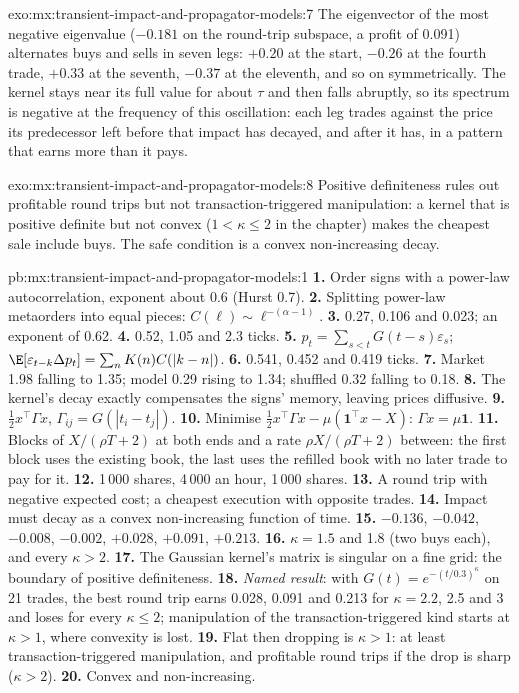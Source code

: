 \begin{solution}{exo:mx:transient-impact-and-propagator-models:7}
The eigenvector of the most negative eigenvalue ($-0.181$ on the round-trip subspace, a profit of 0.091) alternates buys and sells in seven legs: $+0.20$
at the start, $-0.26$ at the fourth trade, $+0.33$ at the seventh, $-0.37$ at the eleventh, and so on symmetrically. The kernel stays near its full value
for about $\tau$ and then falls abruptly, so its spectrum is negative at the frequency of this oscillation: each leg trades against the price its
predecessor left before that impact has decayed, and after it has, in a pattern that earns more than it pays.
\end{solution}

\begin{solution}{exo:mx:transient-impact-and-propagator-models:8}
Positive definiteness rules out profitable round trips but not transaction-triggered manipulation: a kernel that is positive definite but not convex
($1<\kappa\le2$ in the chapter) makes the cheapest sale include buys. The safe condition is a convex non-increasing decay.
\end{solution}

\begin{solution}{pb:mx:transient-impact-and-propagator-models:1}
\textbf{1.} Order signs with a power-law autocorrelation, exponent about 0.6 (Hurst 0.7).
\textbf{2.} Splitting power-law metaorders into equal pieces: $C(\ell)\sim\ell^{-(\alpha-1)}$.
\textbf{3.} 0.27, 0.106 and 0.023; an exponent of 0.62.
\textbf{4.} 0.52, 1.05 and 2.3 ticks.
\textbf{5.} $p_t=\sum_{s<t}G(t-s)\varepsilon_s$; $\E[\varepsilon_{t-k}\Delta p_t]=\sum_nK(n)C(|k-n|)$.
\textbf{6.} 0.541, 0.452 and 0.419 ticks.
\textbf{7.} Market 1.98 falling to 1.35; model 0.29 rising to 1.34; shuffled 0.32 falling to 0.18.
\textbf{8.} The kernel's decay exactly compensates the signs' memory, leaving prices diffusive.
\textbf{9.} $\tfrac12x^\top\Gamma x$, $\Gamma_{ij}=G(|t_i-t_j|)$.
\textbf{10.} Minimise $\tfrac12x^\top\Gamma x-\mu(\mathbf 1^\top x-X)$: $\Gamma x=\mu\mathbf 1$.
\textbf{11.} Blocks of $X/(\rho T+2)$ at both ends and a rate $\rho X/(\rho T+2)$ between: the first block uses the existing book, the last uses the refilled
book with no later trade to pay for it.
\textbf{12.} 1\,000 shares, 4\,000 an hour, 1\,000 shares.
\textbf{13.} A round trip with negative expected cost; a cheapest execution with opposite trades.
\textbf{14.} Impact must decay as a convex non-increasing function of time.
\textbf{15.} $-0.136$, $-0.042$, $-0.008$, $-0.002$, $+0.028$, $+0.091$, $+0.213$.
\textbf{16.} $\kappa=1.5$ and 1.8 (two buys each), and every $\kappa>2$.
\textbf{17.} The Gaussian kernel's matrix is singular on a fine grid: the boundary of positive definiteness.
\textbf{18.} \emph{Named result}: with $G(t)=e^{-(t/0.3)^\kappa}$ on 21 trades, the best round trip earns 0.028, 0.091 and 0.213 for $\kappa=2.2$, 2.5 and 3 and
loses for every $\kappa\le2$; manipulation of the transaction-triggered kind starts at $\kappa>1$, where convexity is lost.
\textbf{19.} Flat then dropping is $\kappa>1$: at least transaction-triggered manipulation, and profitable round trips if the drop is sharp ($\kappa>2$).
\textbf{20.} Convex and non-increasing.
\end{solution}

